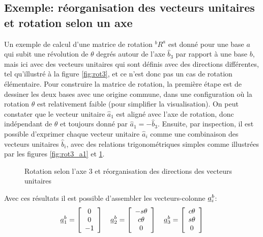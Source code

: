 \subsection{Exemple: réorganisation des vecteurs unitaires et rotation selon un axe}
%
Un exemple de calcul d'une matrice de rotation $^bR^a$ est donné pour une base $a$ qui subit une révolution de $\theta$ degrés autour de l'axe $\hat{b}_3$ par rapport à une base $b$, mais ici avec des vecteurs unitaires qui sont définis avec des directions différentes, tel qu'illustré à la figure \ref{fig:rot3}, et ce n'est donc pas un cas de rotation élémentaire. Pour construire la matrice de rotation, la première étape est de dessiner les deux bases avec une origine commune, dans une configuration où la rotation $\theta$ est relativement faible (pour simplifier la visualisation). On peut constater que le vecteur unitaire $\hat{a}_1$ est aligné avec l'axe de rotation, donc indépendant de $\theta$ et toujours donné par $\hat{a}_1=-\hat{b}_3$. Ensuite, par inspection, il est possible d'exprimer chaque vecteur unitaire $\hat{a}_i$ comme une combinaison des vecteurs unitaires $\hat{b}_i$, avec des relations trigonométriques simples comme illustrées par les figures \ref{fig:rot3_a1} et \ref{fig:rot3_a2}.
%
\begin{figure}[H]
	\centering
	\hspace{20pt}
	\hspace{20pt}
	\caption{Rotation selon l'axe 3 et réorganisation des directions des vecteurs unitaires}
	\label{fig:rot3_a2}
\end{figure}
%
Avec ces résultats il est possible d'assembler les vecteurs-colonne $\underline{a}_i^b$:
\begin{align}
	\underline{a}_1^b = \left[ \begin{array}{c} 0 \\ 0 \\ -1  \end{array} \right] \quad
	\underline{a}_2^b = \left[ \begin{array}{c} -s\theta \\ c\theta \\ 0 \end{array} \right] \quad
	\underline{a}_3^b = \left[ \begin{array}{c} c\theta \\ s\theta \\ 0   \end{array} \right]
\end{align}

